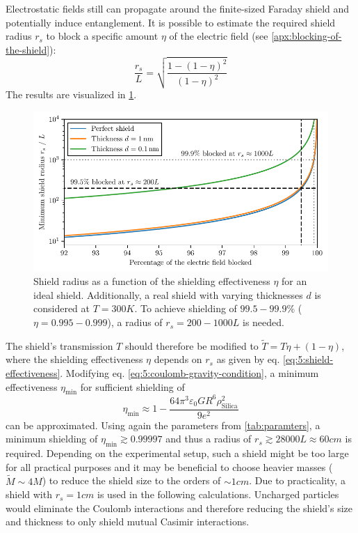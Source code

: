 Electrostatic fields still can propagate around the finite-sized Faraday shield and potentially induce entanglement.
It is possible to estimate the required shield radius $r_s$ to block a specific amount $\eta$ of the electric field (see \cref{apx:blocking-of-the-shield}):
\begin{equation}\label{eq:5:shield-effectiveness}
  \frac{r_s}{L} = \sqrt{\frac{1-(1-\eta)^2}{(1-\eta)^2}}
\end{equation}
The results are visualized in \cref{fig:5:shield-radius}.
\begin{figure}[!ht]
  \centering
  \includegraphics[width=\textwidth]{./../figures/others/shield-radius.pdf}
  \caption{Shield radius as a function of the shielding effectiveness $\eta$ for an ideal shield. Additionally, a real shield with varying thicknesses $d$ is considered at $T=300\si{K}$.
  To achieve shielding of $99.5-99.9\%$ ($\eta = 0.995-0.999$), a radius of $r_s =200-1000L$ is needed.}
  \label{fig:5:shield-radius}
\end{figure}
The shield's transmission $T$ should therefore be modified to $\tilde{T} = T\eta + (1-\eta)$, where the shielding effectiveness $\eta$ depends on $r_s$ as given by eq. \eqref{eq:5:shield-effectiveness}.
Modifying eq. \eqref{eq:5:coulomb-gravity-condition}, a minimum effectiveness $\eta_\mathrm{min}$ for sufficient shielding of
\begin{equation}
  \eta_\mathrm{min} \approx 1 - \frac{64\pi^3 \varepsilon_0 G R^6 \rho^2_\mathrm{Silica}}{9 e^2}
\end{equation}
can be approximated.
Using again the parameters from \cref{tab:paramters}, a minimum shielding of $\eta_\mathrm{min} \gtrsim 0.99997$ and thus a radius of $r_s \gtrsim 28000 L \approx 60\si{cm}$ is required.
Depending on the experimental setup, such a shield might be too large for all practical purposes and it may be beneficial to choose heavier masses ($\tilde{M} \sim 4 M$) to reduce the shield size to the orders of $\sim 1\si{cm}$.
Due to practicality, a shield with $r_s = 1\si{cm}$ is used in the following calculations.
Uncharged particles would eliminate the Coulomb interactions and therefore reducing the shield's size and thickness to only shield mutual Casimir interactions.




